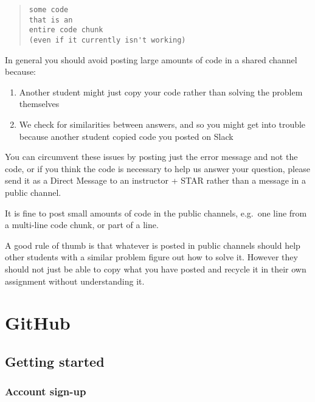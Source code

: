 \documentclass[
]{book}
\providecommand{\tightlist}{%
  \setlength{\itemsep}{0pt}\setlength{\parskip}{0pt}}
\begin{document}
\begin{itemize}
\begin{quote}
\begin{verbatim}
some code
that is an
entire code chunk
(even if it currently isn't working)
\end{verbatim}
  \end{quote}

  In general you should avoid posting large amounts of code in a shared channel because:

  \begin{enumerate}
  \def\labelenumi{\arabic{enumi}.}
  \tightlist
  \item
    Another student might just copy your code rather than solving the problem themselves
  \item
    We check for similarities between answers, and so you might get into trouble because another student copied code you posted on Slack
  \end{enumerate}

  You can circumvent these issues by posting just the error message and not the code, or if you think the code is necessary to help us answer your question, please send it as a Direct Message to an instructor + STAR rather than a message in a public channel.

  It is fine to post small amounts of code in the public channels, e.g.~one line from a multi-line code chunk, or part of a line.

  A good rule of thumb is that whatever is posted in public channels should help other students with a similar problem figure out how to solve it. However they should not just be able to copy what you have posted and recycle it in their own assignment without understanding it.
\end{itemize}

\hypertarget{github}{%
\chapter{GitHub}\label{github}}

\hypertarget{getting-started-1}{%
\section{Getting started}\label{getting-started-1}}

\hypertarget{github-signup}{%
\subsection{Account sign-up}\label{github-signup}}
\end{document}
